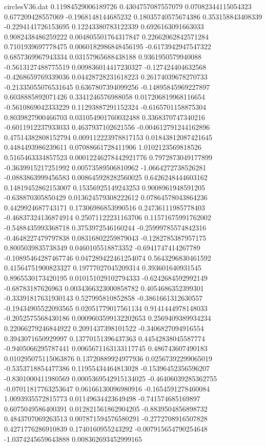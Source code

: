 \begin{filecontents}{circlesV36.dat}
0.11984529006189726	0.4304757087557079	0.07082344115054323
0.677209428557069	-0.1968148144685232	0.18035740575674386
0.353158843408339	-0.2294141726153695	0.12243380783122339
0.6926163091663033	0.9082438486259222	0.004805501764317847
0.22662062842571284	0.7101939697778475	0.0060182986848456195
-0.6173942947547322	0.6857369967943334	0.03157965688438188
0.9361950579940088	-0.5613127488775519	0.009836014417230327
-0.127424404632568	-0.4268659769339036	0.04428728231618223
0.26174039678270733	-0.21335055076531645	0.6367807394099256
-0.14895845969227897	0.6038885892071426	0.3341246576988058
0.017206819968116654	-0.5610869042333229	0.11293887291152324
-0.6165701158875304	0.8039827900466703	0.031054901760032488
0.3368370747340216	-0.6011912237933033	0.4637937102621556
-0.004612791244162896	0.47514382808152794	0.009112223978817153
0.01843812087421645	0.4484493986239611	0.07088661728411906
1.0102123569818526	0.5165463334857523	0.00012246278442921776
0.7972873049177899	-0.3639915217251992	0.00573589506810962
-1.0664272738526281	-0.0883863999456583	0.008645928282560025
0.6426248444603162	0.14819452862153007	0.15356925149243253
0.9008961948591205	-0.638870305850429	0.013624579308222612
0.07864578043864236	0.4429924687743171	0.17306986853990516
0.24736111985778403	-0.46837324136874914	0.25071122231163706
0.11571675991762002	-0.5488435993368718	0.3753972546160244
-0.25999785574842316	-0.4648227479797838	0.08316802259879043
-0.1282785387957175	0.8005039835738349	0.0460105518873352
-0.6941747414267789	-0.10895464287467746	0.047289422461254074
0.5643296830461592	0.41564751900823327	0.19777027045209314
0.393601640931545	0.8965530173420195	0.010151029102794333
-0.6242684592992149	-0.68783187626963	0.0034366323000858782
0.4054686352399301	-0.33391817631930143	0.527995810852858
-0.3861661312630557	-0.19434905522093565	0.02051779017561134
0.9141444978148033	-0.2052575568430186	0.0009603599132202653
0.2569409389934234	0.22066279246844922	0.2091437398101522
-0.3406827094916554	0.3943071650929997	0.13770151396437363
0.44542838045587774	-0.9405066295787441	0.0065671163133117745
0.486743607490183	0.010295075115063876	0.13720889924977936
0.02567392299065019	-0.5353718854477386	0.11955434464813028
-0.15396452356596207	-0.8301000411980569	0.0005369542915134025
-0.46406039285362755	-0.07011817763253647	0.06166130096980916
-0.1654591278460084	1.0093935572815773	0.01149634423649498
-0.741574685169897	0.6075049586400391	0.012821561862904205
-0.8839504856898732	0.4843707069263513	0.007871594576580291
-0.2772708916507828	0.4271776286910839	0.1740160955243292
-0.007915654790254648	-1.0374245659643888	0.008362693452999165

\end{filecontents}

